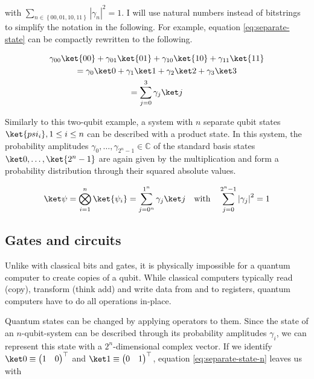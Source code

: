 with $\sum_{n \in \left\{00, 01, 10, 11\right\}} \left|\gamma_n\right|^2 = 1$.
I will use natural numbers instead of bitstrings to simplify the notation in
the following.
For example, equation \ref{eq:separate-state} can be compactly rewritten to the
following.

\begin{equation}
    \label{eq:separate-state-natural-numbers}
    \begin{gathered}
            \gamma_{00} \ket{00} + \gamma_{01} \ket{01} + \gamma_{10} \ket{10} + \gamma_{11} \ket{11}\\
        =   \gamma_0 \ket 0 + \gamma_1 \ket 1 + \gamma_2 \ket 2 + \gamma_3 \ket 3\\
        =   \sum_{j=0}^3 \gamma_j \ket j
    \end{gathered}
\end{equation}

Similarly to this two-qubit example, a system with $n$ separate qubit states
$\ket{psi_i}, 1 \leq i \leq n$ can be described with a product state.
In this system, the probability amplitudes
$\gamma_0, \dots, \gamma_{2^n -1} \in \mathbb C$ of the standard basis states
$\ket 0, \dots, \ket{2^n -1}$ are again given by the multiplication and form a
probability distribution through their squared absolute values.

\begin{equation}
    \label{eq:separate-state-n}
    \ket\psi = \bigotimes_{i=1}^n \ket{\psi_i} = \sum_{j=0^n}^{1^n} \gamma_j \ket j
        \quad\text{with}\quad \sum_{j=0}^{2^n -1} \left|\gamma_j\right|^2 = 1
\end{equation}

\subsection{Gates and circuits}

Unlike with classical bits and gates, it is physically impossible for a quantum
computer to create copies of a qubit.
While classical computers typically read (copy), transform (think add) and write
data from and to registers, quantum computers have to do all operations
in-place.

Quantum states can be changed by applying operators to them.
Since the state of an $n$-qubit-system can be described through its probability
amplitudes $\gamma_i$, we can represent this state with a $2^n$-dimensional
complex vector.
If we identify $\ket 0 \equiv \begin{pmatrix}1 & 0\end{pmatrix}^\top$ and
$\ket 1 \equiv \begin{pmatrix}0 & 1\end{pmatrix}^\top$,
equation \ref{eq:separate-state-n} leaves us with

